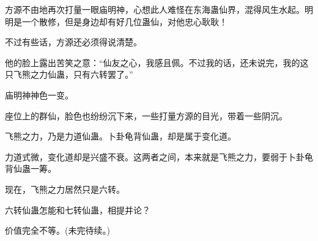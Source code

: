 \begin{this_body}
方源不由地再次打量一眼庙明神，心想此人难怪在东海蛊仙界，混得风生水起。明明是一个散修，但是身边却有好几位蛊仙，对他忠心耿耿！

不过有些话，方源还必须得说清楚。

他的脸上露出苦笑之意：“仙友之心，我感且佩。不过我的话，还未说完，我的这只飞熊之力仙蛊，只有六转罢了。”

庙明神神色一变。

座位上的群仙，脸色也纷纷沉下来，一些打量方源的目光，带着一些阴沉。

飞熊之力，乃是力道仙蛊。卜卦龟背仙蛊，却是属于变化道。

力道式微，变化道却是兴盛不衰。这两者之间，本来就是飞熊之力，要弱于卜卦龟背仙蛊一筹。

现在，飞熊之力居然只是六转。

六转仙蛊怎能和七转仙蛊，相提并论？

价值完全不等。(未完待续。)

\end{this_body}

